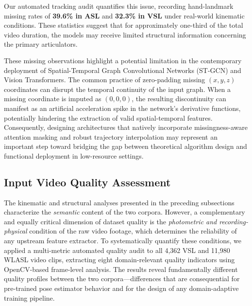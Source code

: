\documentclass{ieeeaccess}
\begin{document}
Our automated tracking audit quantifies this issue, recording hand-landmark missing rates of \textbf{39.6\% in ASL} and \textbf{32.3\% in VSL} under real-world kinematic conditions. These statistics suggest that for approximately one-third of the total video duration, the models may receive limited structural information concerning the primary articulators.

These missing observations highlight a potential limitation in the contemporary deployment of Spatial-Temporal Graph Convolutional Networks (ST-GCN) and Vision Transformers. The common practice of zero-padding missing $(x,y,z)$ coordinates can disrupt the temporal continuity of the input graph. When a missing coordinate is imputed as $(0,0,0)$, the resulting discontinuity can manifest as an artificial acceleration spike in the network's derivative functions, potentially hindering the extraction of valid spatial-temporal features. Consequently, designing architectures that natively incorporate missingness-aware attention masking and robust trajectory interpolation may represent an important step toward bridging the gap between theoretical algorithm design and functional deployment in low-resource settings.

\subsection{Input Video Quality Assessment}
\label{sec:quality_assessment}

The kinematic and structural analyses presented in the preceding subsections characterize the \textit{semantic} content of the two corpora. However, a complementary and equally critical dimension of dataset quality is the \textit{photometric and recording-physical} condition of the raw video footage, which determines the reliability of any upstream feature extractor. To systematically quantify these conditions, we applied a multi-metric automated quality audit to all 4,362 VSL and 11,980 WLASL video clips, extracting eight domain-relevant quality indicators using OpenCV-based frame-level analysis. The results reveal fundamentally different quality profiles between the two corpora—differences that are consequential for pre-trained pose estimator behavior and for the design of any domain-adaptive training pipeline.
\end{document}
